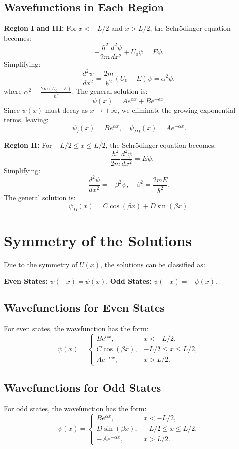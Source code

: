 \documentclass[a4paper,12pt]{article}
\begin{document}
\begin{multicols}{2}
\subsection{Wavefunctions in Each Region}
\textbf{Region I and III:} For \( x < -L/2 \) and \( x > L/2 \), the Schrödinger equation becomes:
\[
-\frac{\hbar^2}{2m} \frac{d^2\psi}{dx^2} + U_0\psi = E\psi.
\]
Simplifying:
\[
\frac{d^2\psi}{dx^2} = \frac{2m}{\hbar^2}(U_0 - E)\psi = \alpha^2 \psi,
\]
where \( \alpha^2 = \frac{2m(U_0 - E)}{\hbar^2} \). The general solution is:
\[
\psi(x) = A e^{\alpha x} + B e^{-\alpha x}.
\]
Since \( \psi(x) \) must decay as \( x \to \pm\infty \), we eliminate the growing exponential terms, leaving:
\[
\psi_I(x) = B e^{\alpha x}, \quad \psi_{III}(x) = A e^{-\alpha x}.
\]

\textbf{Region II:} For \( -L/2 \leq x \leq L/2 \), the Schrödinger equation becomes:
\[
-\frac{\hbar^2}{2m} \frac{d^2\psi}{dx^2} = E\psi.
\]
Simplifying:
\[
\frac{d^2\psi}{dx^2} = -\beta^2 \psi, \quad \beta^2 = \frac{2mE}{\hbar^2}.
\]
The general solution is:
\[
\psi_{II}(x) = C \cos(\beta x) + D \sin(\beta x).
\]

\section{Symmetry of the Solutions}
Due to the symmetry of \( U(x) \), the solutions can be classified as:

\textbf{Even States:} \( \psi(-x) = \psi(x) \).  
\textbf{Odd States:} \( \psi(-x) = -\psi(x) \).

\subsection{Wavefunctions for Even States}
For even states, the wavefunction has the form:
\[
\psi(x) = 
\begin{cases} 
B e^{\alpha x}, & x < -L/2, \\
C \cos(\beta x), & -L/2 \leq x \leq L/2, \\
A e^{-\alpha x}, & x > L/2.
\end{cases}
\]

\subsection{Wavefunctions for Odd States}
For odd states, the wavefunction has the form:
\[
\psi(x) = 
\begin{cases} 
B e^{\alpha x}, & x < -L/2, \\
D \sin(\beta x), & -L/2 \leq x \leq L/2, \\
-A e^{-\alpha x}, & x > L/2.
\end{cases}
\]


\end{multicols}
\end{document}
